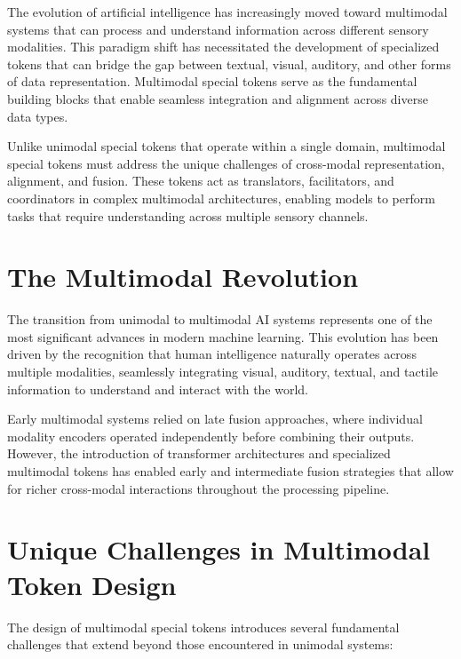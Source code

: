 
The evolution of artificial intelligence has increasingly moved toward multimodal systems that can process and understand information across different sensory modalities. This paradigm shift has necessitated the development of specialized tokens that can bridge the gap between textual, visual, auditory, and other forms of data representation. Multimodal special tokens serve as the fundamental building blocks that enable seamless integration and alignment across diverse data types.

Unlike unimodal special tokens that operate within a single domain, multimodal special tokens must address the unique challenges of cross-modal representation, alignment, and fusion. These tokens act as translators, facilitators, and coordinators in complex multimodal architectures, enabling models to perform tasks that require understanding across multiple sensory channels.

\section{The Multimodal Revolution}

The transition from unimodal to multimodal AI systems represents one of the most significant advances in modern machine learning. This evolution has been driven by the recognition that human intelligence naturally operates across multiple modalities, seamlessly integrating visual, auditory, textual, and tactile information to understand and interact with the world.

Early multimodal systems relied on late fusion approaches, where individual modality encoders operated independently before combining their outputs. However, the introduction of transformer architectures and specialized multimodal tokens has enabled early and intermediate fusion strategies that allow for richer cross-modal interactions throughout the processing pipeline.

\section{Unique Challenges in Multimodal Token Design}

The design of multimodal special tokens introduces several fundamental challenges that extend beyond those encountered in unimodal systems:


